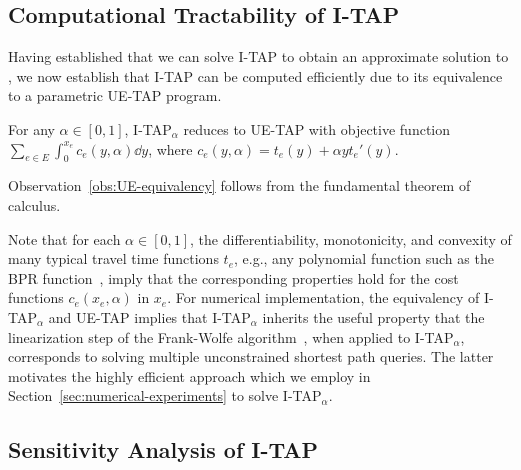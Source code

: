 \documentclass{article}
\newif\ifarxiv   %
\begin{document}
\subsection{Computational Tractability of I-TAP} \label{sec:compTractability}

Having established that we can solve I-TAP to obtain an approximate solution to \fso, we now establish that I-TAP can be computed efficiently due to its equivalence to a parametric UE-TAP program.


\begin{observation}  \label{obs:UE-equivalency}
For any $\alpha \in [0, 1]$, I-TAP$_{\alpha}$ reduces to UE-TAP with objective function $\sum_{e \in E}\int_{0}^{x_e} c_e(y, \alpha) \dd{y}$, where $c_e(y, \alpha) = t_e(y) + \alpha y t_e'(y)$.
\end{observation}
\ifarxiv 
To see Observation~\ref{obs:UE-equivalency}, note that by the fundamental theorem of calculus, $\objso(\x)$ can be written as
$$\objso(\x) = \sum_{e \in E} x_e t_e(x_e) = \sum_{e \in E} \int_{0}^{x_e} t_e(y) + y t_e'(y) \dd{y}. $$
Then, taking a convex combination of the SO-TAP and UE-TAP objectives, it is clear that 
$$\objitap(\x) = \sum_{e \in E}\int_{0}^{x_e} t_e(y) + \alpha y t_e'(y) \dd{y}.$$
\else
Observation~\ref{obs:UE-equivalency} follows %
from the fundamental theorem of calculus.
\fi 
Note that for each $\alpha \in [0, 1]$, the differentiability, monotonicity, and convexity of many typical travel time functions $t_e$, e.g., any polynomial function such as the BPR function~\cite{Sheffi1985}, imply that the corresponding properties hold for the cost functions $c_e(x_e, \alpha)$ in $x_e$. For numerical implementation, %
the equivalency of I-TAP$_\alpha$ and UE-TAP implies that I-TAP$_\alpha$ inherits the useful property that the linearization step of the Frank-Wolfe algorithm~\cite{Sheffi1985}, when applied to I-TAP$_\alpha$, corresponds to solving multiple 
unconstrained shortest path queries. The latter motivates the highly efficient approach which we employ in Section~\ref{sec:numerical-experiments} to solve I-TAP$_\alpha$.

\ifarxiv
\subsection{Sensitivity Analysis of I-TAP} \label{sec:solution-properties}
\end{document}
